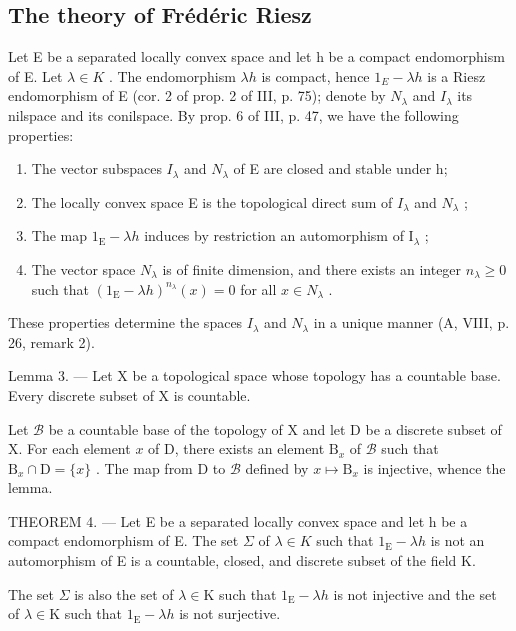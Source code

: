 \subsection{The theory of Frédéric Riesz}

Let E be a separated locally convex space and let h be a compact endomorphism of E. Let \(\lambda \in K\) . The endomorphism \(\lambda h\) is compact, hence \(1_{E} - \lambda h\) is a Riesz endomorphism of E (cor. 2 of prop. 2 of III, p. 75); denote by \(N_{\lambda}\) and \(I_{\lambda}\) its nilspace and its conilspace. By prop. 6 of III, p. 47, we have the following properties:

\begin{enumerate}
\def\labelenumi{(\roman{enumi})}
\item
  The vector subspaces \(I_{\lambda}\) and \(N_{\lambda}\) of E are closed and stable under h;
\item
  The locally convex space E is the topological direct sum of \(I_{\lambda}\) and \(N_{\lambda}\) ;
\item
  The map \(1_{\mathrm{E}} - \lambda h\) induces by restriction an automorphism of \(\mathrm{I}_{\lambda}\) ;
\item
  The vector space \(N_{\lambda}\) is of finite dimension, and there exists an integer \(n_{\lambda} \geqslant 0\) such that \((1_{\mathrm{E}} - \lambda h)^{n_{\lambda}}(x) = 0\) for all \(x \in N_{\lambda}\) .
\end{enumerate}

These properties determine the spaces \(I_{\lambda}\) and \(N_{\lambda}\) in a unique manner (A, VIII, p. 26, remark 2).

Lemma 3. --- Let X be a topological space whose topology has a countable base. Every discrete subset of X is countable.

Let \(\mathcal{B}\) be a countable base of the topology of X and let D be a discrete subset of X. For each element \(x\) of D, there exists an element \(\mathrm{B}_x\) of \(\mathcal{B}\) such that \(\mathrm{B}_x \cap \mathrm{D} = \{x\}\) . The map from D to \(\mathcal{B}\) defined by \(x \mapsto \mathrm{B}_x\) is injective, whence the lemma.

THEOREM 4. --- Let E be a separated locally convex space and let h be a compact endomorphism of E. The set \(\Sigma\) of \(\lambda \in K\) such that \(1_{\mathrm{E}} - \lambda h\) is not an automorphism of E is a countable, closed, and discrete subset of the field K.

The set \(\Sigma\) is also the set of \(\lambda\in\mathrm{K}\) such that \(1_{\mathrm{E}}-\lambda h\) is not injective and the set of \(\lambda\in\mathrm{K}\) such that \(1_{\mathrm{E}}-\lambda h\) is not surjective.

